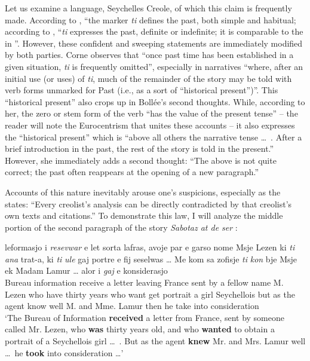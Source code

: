 Let us examine a language, Seychelles Creole, of which this claim is frequently made. According to \citet[102]{Corne1977}, ``the marker \textit{ti} defines the past, both simple and habitual{\textquotedbl}; according to \citet[55]{Bollee1977}, ``\textit{ti} expresses the past, definite or indefinite; it is comparable to the  in ''. However, these confident and sweeping statements are immediately modified by both parties. Corne observes that ``once past time has been established in a given situation, \textit{ti} is frequently omitted'', especially in narratives ``where, after an initial use (or uses) of \textit{ti}, much of the remainder of the story may be told with verb forms unmarked for Past (i.e., as a sort of ``historical present'')''. This ``historical present'' also crops up in Bollée's second thoughts. While, according to her, the zero or stem form of the verb ``has the value of the  present tense'' -- the reader will note the Euro\-centrism that unites these accounts -- it also expresses the ``historical present'' which is ``above all others the narrative tense \ldots~. After a brief introduction in the past, the rest of the story is told in the pres\-ent.'' However, she immediately adds a second thought: ``The above is not quite correct; the past often reappears at the opening of a new paragraph.''

Accounts of this nature inevitably arouse one's suspicions, especially as the  states: ``Every creolist's analysis can be directly contradicted by that creolist's own texts and citations.'' To demonstrate this law, I will analyze the middle portion of the second paragraph of the story \textit{Sabotaz at de ser} \citep[166]{Bollee1977}:

\ea\label{ex:2:94}
 {leformasjo} {i} \emph{resevwar} {e} {let} {sorta} {lafras,} {avoje} {par} {e} {garso} {nome} {M}{sje} {Lezen} {ki} \emph{ti} \emph{ana} {trat-a,} {ki} \emph{ti} \emph{ule} {gaj} {portre} {e} {fij} {seselwas} {\ldots } {Me} {kom} {sa} {zofisje} \emph{ti} \emph{kon} {b}{je} {Msje} {ek} {M}{adam} {Lamur} {\ldots} {alor} i \emph{gaj} {e} {konsiderasjo} \\
Bureau information {\PM} receive a letter leaving France sent by a fellow name M. Lezen who {\TNS} have {thirty years} who {\TNS} want get portrait a girl Seychellois { } but as the agent {\TNS} know well M. and Mme. Lamur { } then he take into consideration\\
\glt `The Bureau of Information \textbf{received} a letter from France, sent by someone called Mr. Lezen, who \textbf{was} thirty years old, and who \textbf{wanted} to obtain a portrait of a Seychellois girl \ldots~. But as the agent \textbf{knew} Mr. and Mrs. Lamur well \ldots~he \textbf{took} into consideration \ldots '
\z


